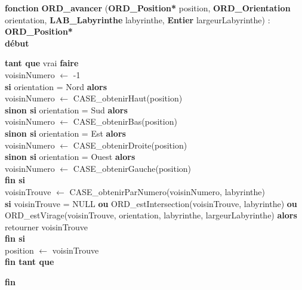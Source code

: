 \noindent\textbf{fonction} \textbf{ORD\_avancer} (\textbf{ORD\_Position*} position, \textbf{ORD\_Orientation} orientation, \textbf{LAB\_Labyrinthe} labyrinthe, \textbf{Entier} largeurLabyrinthe) : \textbf{ORD\_Position*}\\
\textbf{début}
\begin{flushleft}
    \hspace*{1cm}\textbf{tant que} vrai \textbf{faire}\\
    \hspace*{2cm}voisinNumero $\gets$ -1\\
    \hspace*{2cm}\textbf{si} orientation = Nord \textbf{alors}\\
    \hspace*{3cm}voisinNumero $\gets$ CASE\_obtenirHaut(position)\\
    \hspace*{2cm}\textbf{sinon si} orientation = Sud \textbf{alors}\\
    \hspace*{3cm}voisinNumero $\gets$ CASE\_obtenirBas(position)\\
    \hspace*{2cm}\textbf{sinon si} orientation = Est \textbf{alors}\\
    \hspace*{3cm}voisinNumero $\gets$ CASE\_obtenirDroite(position)\\
    \hspace*{2cm}\textbf{sinon si} orientation = Ouest \textbf{alors}\\
    \hspace*{3cm}voisinNumero $\gets$ CASE\_obtenirGauche(position)\\
    \hspace*{2cm}\textbf{fin si}\\
    \hspace*{2cm}voisinTrouve $\gets$ CASE\_obtenirParNumero(voisinNumero, labyrinthe)\\
    \hspace*{2cm}\textbf{si} voisinTrouve = NULL \textbf{ou} ORD\_estIntersection(voisinTrouve, labyrinthe) \textbf{ou}\\
    \hspace*{2cm}ORD\_estVirage(voisinTrouve, orientation, labyrinthe, largeurLabyrinthe) \textbf{alors}\\
    \hspace*{3cm}retourner voisinTrouve\\
    \hspace*{2cm}\textbf{fin si}\\
    \hspace*{2cm}position $\gets$ voisinTrouve\\
    \hspace*{1cm}\textbf{fin tant que}
\end{flushleft}
\textbf{fin}\\


